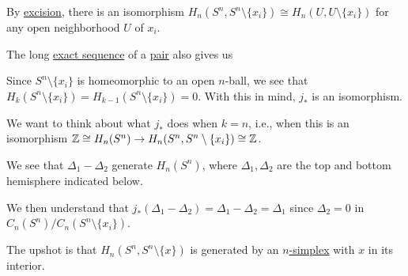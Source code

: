 By \hyperref[thm:excision]{excision}, there is an isomorphism \(H_n(S^n, S^n \setminus \{x_i\}) \cong H_n(U, U \setminus \{x_i\})\) for any open
neighborhood \(U\) of \(x_i\).

The long \hyperref[def:exact-sequence]{exact sequence} of a \hyperref[def:good-pair]{pair} also gives us
\par
{}

\par Since \(S^n \setminus \{x_i\}\) is homeomorphic to an open \(n\)-ball, we see that \(H_k(S^n \setminus \{x_i\}) = H_{k - 1}(S^n \setminus \{x_i\}) = 0\).
With this in mind, \(j_\ast\) is an isomorphism.

We want to think about what \(j_\ast\) does when \(k = n\), i.e., when this is an isomorphism \(\mathbb{\MakeUppercase{z}}\cong H_n(S^n) \to H_n(S^n, S^n \setminus \{x_i\}) \cong \mathbb{Z}\).

We see that \(\Delta_1 - \Delta_2\) generate \(H_n(S^n)\), where \(\Delta_1, \Delta_2\) are the top and bottom hemisphere indicated below.
\begin{figure}[H]
	\centering
	\label{fig:les-on-relative-spheres}
\end{figure}
We then understand that \(j_\ast(\Delta_1 - \Delta_2) = \Delta_1 - \Delta_2 = \Delta_1\) since \(\Delta_2 = 0\) in \(C_n(S^n)/C_n(S^n \setminus \{x_i\})\).

The upshot is that \(H_n(S^n, S^n \setminus \{x\})\) is generated by an \hyperref[def:standard-simplex]{\(n\)-simplex} with \(x\) in its interior.

